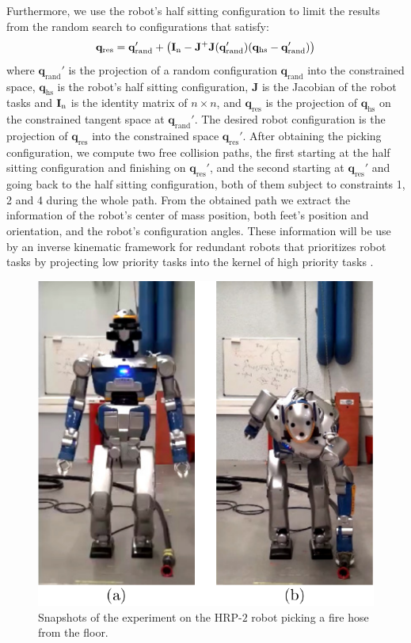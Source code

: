 Furthermore, we use the robot's half sitting configuration to limit the results from the random search to configurations that satisfy:
%
\vspace{-1mm}
\begin{equation*}
\mathbf{q}_{\text{res}} = \mathbf{q}_{\text{rand}}' + \big( \mathbf{I}_{\text n} - \mathbf{J}^{+}\mathbf{J}(\mathbf{q}_{\text{rand}}')(\mathbf{q}_{\text{hs}} - \mathbf{q}_{\text{rand}}') \big)
\vspace{-1mm}
\end{equation*}
%
where $\mathbf{q}_{\text{rand}}'$ is the projection of a random configuration $\mathbf{q}_{\text{rand}}$ into the constrained space, $\mathbf{q}_{\text{hs}}$ is the robot's half sitting configuration, $\mathbf J$ is the Jacobian of the robot tasks and $\mathbf{I}_{\text n}$ is the identity matrix of $n\times n$, and $\mathbf{q}_{\text{res}}$ is the projection of $\mathbf{q}_{\text{hs}}$ on the constrained tangent space at $\mathbf{q}_{\text{rand}}'$.
%
The desired robot configuration is the projection of $\mathbf{q}_{\text{res}}$ into the constrained space $\mathbf{q}_{\text{res}}'$. 
%
%
After obtaining the picking configuration, we compute two free collision paths, the first starting at the half sitting configuration and finishing on $\mathbf{q}_{\text{res}}'$, and the second starting at $\mathbf{q}_{\text{res}}'$ and going back to the half sitting configuration, both of them subject to constraints 1, 2 and 4 during the whole path.
%
From the obtained path we extract the information of the robot's center of mass position, both feet's position and orientation, and the robot's configuration angles.
%
These information will be use by an inverse kinematic framework for redundant robots that prioritizes robot tasks by projecting low priority tasks into the kernel of high priority tasks \cite{mansard:icar:09}.
%
\begin{figure}[t]
 \centering
 \includegraphics[height=0.40\textwidth]{./figures/Pick_2pics.pdf}
 \vspace{-3mm}
 \caption{Snapshots of the experiment on the HRP-$2$ robot picking a fire hose from the floor.}
 \label{exp_pick}
\end{figure}
